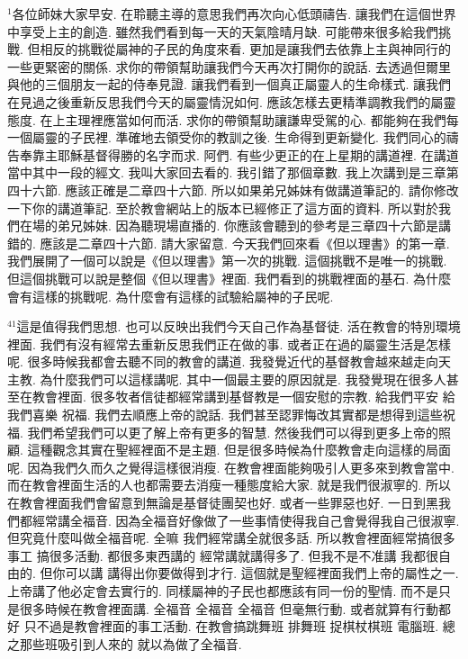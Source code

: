 \documentclass{book}
\begin{document}
$^{1}$各位師妹大家早安.
在聆聽主導的意思我們再次向心低頭禱告.
讓我們在這個世界中享受上主的創造.
雖然我們看到每一天的天氣陰晴月缺.
可能帶來很多給我們挑戰.
但相反的挑戰從屬神的子民的角度來看.
更加是讓我們去依靠上主與神同行的一些更緊密的關係.
求你的帶領幫助讓我們今天再次打開你的說話.
去透過但爾里與他的三個朋友一起的侍奉見證.
讓我們看到一個真正屬靈人的生命樣式.
讓我們在見過之後重新反思我們今天的屬靈情況如何.
應該怎樣去更精準調教我們的屬靈態度.
在上主理裡應當如何而活.
求你的帶領幫助讓謙卑受駕的心.
都能夠在我們每一個屬靈的子民裡.
準確地去領受你的教訓之後.
生命得到更新變化.
我們同心的禱告奉靠主耶穌基督得勝的名字而求.
阿們.
有些少更正的在上星期的講道裡.
在講道當中其中一段的經文.
我叫大家回去看的.
我引錯了那個章數.
我上次講到是三章第四十六節.
應該正確是二章四十六節.
所以如果弟兄姊妹有做講道筆記的.
請你修改一下你的講道筆記.
至於教會網站上的版本已經修正了這方面的資料.
所以對於我們在場的弟兄姊妹.
因為聽現場直播的.
你應該會聽到的參考是三章四十六節是講錯的.
應該是二章四十六節.
請大家留意.
今天我們回來看《但以理書》的第一章.
我們展開了一個可以說是《但以理書》第一次的挑戰.
這個挑戰不是唯一的挑戰.
但這個挑戰可以說是整個《但以理書》裡面.
我們看到的挑戰裡面的基石.
為什麼會有這樣的挑戰呢.
為什麼會有這樣的試驗給屬神的子民呢.

$^{41}$這是值得我們思想.
也可以反映出我們今天自己作為基督徒.
活在教會的特別環境裡面.
我們有沒有經常去重新反思我們正在做的事.
或者正在過的屬靈生活是怎樣呢.
很多時候我都會去聽不同的教會的講道.
我發覺近代的基督教會越來越走向天主教.
為什麼我們可以這樣講呢.
其中一個最主要的原因就是.
我發覺現在很多人甚至在教會裡面.
很多牧者信徒都經常講到基督教是一個安慰的宗教.
給我們平安 給我們喜樂 祝福.
我們去順應上帝的說話.
我們甚至認罪悔改其實都是想得到這些祝福.
我們希望我們可以更了解上帝有更多的智慧.
然後我們可以得到更多上帝的照顧.
這種觀念其實在聖經裡面不是主題.
但是很多時候為什麼教會走向這樣的局面呢.
因為我們久而久之覺得這樣很消瘦.
在教會裡面能夠吸引人更多來到教會當中.
而在教會裡面生活的人也都需要去消瘦一種態度給大家.
就是我們很淑寧的.
所以在教會裡面我們會留意到無論是基督徒團契也好.
或者一些罪惡也好.
一日到黑我們都經常講全福音.
因為全福音好像做了一些事情使得我自己會覺得我自己很淑寧.
但究竟什麼叫做全福音呢.
全嘛 我們經常講全就很多話.
所以教會裡面經常搞很多事工 搞很多活動.
都很多東西講的 經常講就講得多了.
但我不是不准講 我都很自由的.
但你可以講 講得出你要做得到才行.
這個就是聖經裡面我們上帝的屬性之一.
上帝講了他必定會去實行的.
同樣屬神的子民也都應該有同一份的聖情.
而不是只是很多時候在教會裡面講.
全福音 全福音 全福音 但毫無行動.
或者就算有行動都好 只不過是教會裡面的事工活動.
在教會搞跳舞班 排舞班 捉棋杖棋班 電腦班.
總之那些班吸引到人來的 就以為做了全福音.
\end{document}

